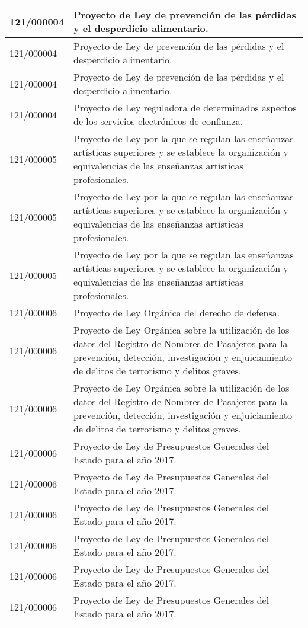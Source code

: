 {\begin{table}[H]
\begin{center}
\begin{tabularx}{\linewidth}{| l | X |}
\hline
121/000004 & Proyecto de Ley de prevención de las pérdidas y el desperdicio alimentario. \\
\hline
121/000004 & Proyecto de Ley de prevención de las pérdidas y el desperdicio alimentario. \\
\hline
121/000004 & Proyecto de Ley de prevención de las pérdidas y el desperdicio alimentario. \\
\hline
121/000004 & Proyecto de Ley reguladora de determinados aspectos de los servicios electrónicos de confianza. \\
\hline
121/000005 & Proyecto de Ley por la que se regulan las enseñanzas artísticas superiores y se establece la organización y equivalencias de las enseñanzas artísticas profesionales. \\
\hline
121/000005 & Proyecto de Ley por la que se regulan las enseñanzas artísticas superiores y se establece la organización y equivalencias de las enseñanzas artísticas profesionales. \\
\hline
121/000005 & Proyecto de Ley por la que se regulan las enseñanzas artísticas superiores y se establece la organización y equivalencias de las enseñanzas artísticas profesionales. \\
\hline
121/000006 & Proyecto de Ley Orgánica del derecho de defensa. \\
\hline
121/000006 & Proyecto de Ley Orgánica sobre la utilización de los datos del Registro de Nombres de Pasajeros para la prevención, detección, investigación y enjuiciamiento de delitos de terrorismo y delitos graves. \\
\hline
121/000006 & Proyecto de Ley Orgánica sobre la utilización de los datos del Registro de Nombres de Pasajeros para la prevención, detección, investigación y enjuiciamiento de delitos de terrorismo y delitos graves. \\
\hline
121/000006 & Proyecto de Ley de Presupuestos Generales del Estado para el año 2017. \\
\hline
121/000006 & Proyecto de Ley de Presupuestos Generales del Estado para el año 2017. \\
\hline
121/000006 & Proyecto de Ley de Presupuestos Generales del Estado para el año 2017. \\
\hline
121/000006 & Proyecto de Ley de Presupuestos Generales del Estado para el año 2017. \\
\hline
121/000006 & Proyecto de Ley de Presupuestos Generales del Estado para el año 2017. \\
\hline
121/000006 & Proyecto de Ley de Presupuestos Generales del Estado para el año 2017. \\

\end{tabularx}
\end{center}
\end{table}}
